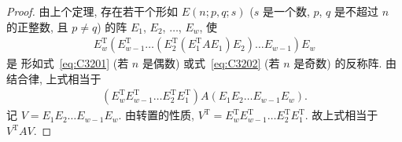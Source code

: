 \documentclass[../libro.tex]{subfiles}
\begin{document}
\begin{proof}
    由上个定理, 存在若干个形如 \(E(n; p, q; s)\)
    (\(s\) 是一个数, %
    \(p\), \(q\) 是不超过 \(n\) 的正整数,
    且 \(p \neq q\)) %
    的阵
    \(E_1\), \(E_2\), \(\dots\), \(E_w\),
    使
    \begin{align*}
        E_w^{\mathrm{T}}
        (E_{w-1}^{\mathrm{T}}
            \dots
            (E_2^{\mathrm{T}}
                (E_1^{\mathrm{T}}
                    A
                E_1)
            E_2)
            \dots
        E_{w-1})
        E_w
    \end{align*}
    是%
    形如式~\eqref{eq:C3201} (若 \(n\) 是偶数)
    或式~\eqref{eq:C3202} (若 \(n\) 是奇数)
    的反称阵.
    由结合律, 上式相当于
    \begin{align*}
        (E_w^{\mathrm{T}}
            E_{w-1}^{\mathrm{T}}
            \dots
            E_2^{\mathrm{T}}
        E_1^{\mathrm{T}})
        A
        (E_1
            E_2
            \dots
            E_{w-1}
        E_w).
    \end{align*}
    记 \(V = E_1 E_2 \dots E_{w-1} E_w\).
    由转置的性质,
    \(V^{\mathrm{T}}
        = E_w^{\mathrm{T}}
        E_{w-1}^{\mathrm{T}}
        \dots
        E_2^{\mathrm{T}}
    E_1^{\mathrm{T}}\).
    故上式相当于 \(V^{\mathrm{T}} A V\).
\end{proof}
\end{document}
